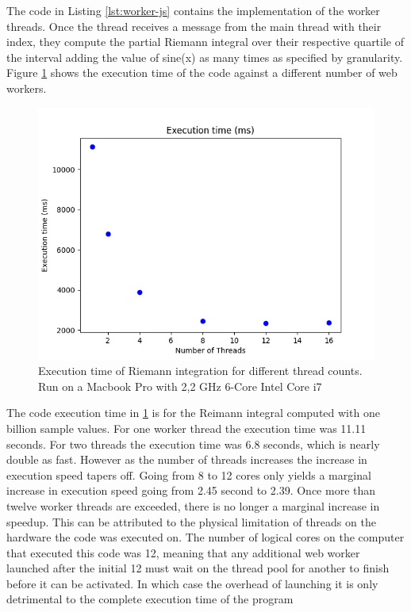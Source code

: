 \documentclass[11pt]{book}
\begin{document}
The code in Listing \ref{lst:worker-js} contains the implementation of the worker threads. Once the thread receives a message from the main thread with their index, they compute the partial Riemann integral over their respective quartile of the interval adding the value of sine(x) as many times as specified by granularity. Figure \ref{png:integrate} shows the execution time of the code against a different number of web workers.



\begin{figure}[H]
\centerline{\includegraphics[width=\textwidth]{figures/integrate_exe_times.png}}
\caption{Execution time of Riemann integration for different thread counts. Run on a Macbook Pro with 2,2 GHz 6-Core Intel Core i7}
\label{png:integrate}
\end{figure}

The code execution time in \ref{png:integrate} is for the Reimann integral computed with one billion sample values. For one worker thread the execution time was 11.11 seconds. For two threads the execution time was 6.8 seconds, which is nearly double as fast. However as the number of threads increases the increase in execution speed tapers off. Going from 8 to 12 cores only yields a marginal increase in execution speed going from 2.45 second to 2.39. Once more than twelve worker threads are exceeded, there is no longer a marginal increase in speedup. This can be attributed to the physical limitation of threads on the hardware the code was executed on. The number of logical cores on the computer that executed this code was 12, meaning that any additional web worker launched after the initial 12 must wait on the thread pool for another to finish before it can be activated. In which case the overhead of launching it is only detrimental to the complete execution time of the program
\end{document}
